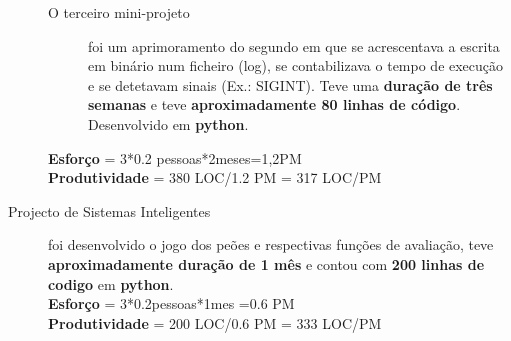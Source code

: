 \documentclass[a4paper]{report}
\begin{document}
\begin{description}
\begin{description}
		\item[O terceiro mini-projeto] foi um aprimoramento do segundo em que se acrescentava a escrita em binário num ficheiro (log), se contabilizava o tempo de execução e se detetavam sinais (Ex.: SIGINT). Teve uma \textbf{duração de três semanas} e teve \textbf{aproximadamente 80 linhas de código}. Desenvolvido em \textbf{python}.
	\end{description}\mbox{}\textbf{Esforço} = 3*0.2 pessoas*2meses=1,2PM\\ \textbf{Produtividade} = 380 LOC/1.2 PM = 317 LOC/PM
	\item[Projecto de Sistemas Inteligentes] foi desenvolvido o jogo dos peões e respectivas funções de avaliação, teve \textbf{aproximadamente duração de 1 mês} e contou com \textbf{200 linhas de codigo} em \textbf{python}.\\\textbf{Esforço} = 3*0.2pessoas*1mes =0.6 PM\\ \textbf{Produtividade} = 200 LOC/0.6 PM = 333 LOC/PM
\end{description}
\end{document}

